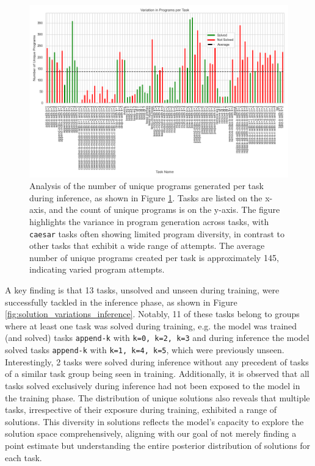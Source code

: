 \begin{figure}[H]
    \centering
    \includegraphics[width=\textwidth]{../img/plot_program_variations_binary_inference.png}
    \caption{Analysis of the number of unique programs generated per task during inference, as shown in Figure \ref{fig:program_variations_binary_inference}. Tasks are listed on the x-axis, and the count of unique programs is on the y-axis. The figure highlights the variance in program generation across tasks, with \texttt{caesar} tasks often showing limited program diversity, in contrast to other tasks that exhibit a wide range of attempts. The average number of unique programs created per task is approximately 145, indicating varied program attempts.}
    \label{fig:program_variations_binary_inference}
\end{figure}


A key finding is that 13 tasks, unsolved and unseen during training, were successfully tackled in the inference phase, as shown in Figure \ref{fig:solution_variations_inference}. Notably, 11 of these tasks belong to groups where at least one task was solved during training, e.g. the model was trained (and solved) tasks \texttt{append-k} with \texttt{k=0, k=2, k=3} and during inference the model solved tasks \texttt{append-k} with \texttt{k=1, k=4, k=5}, which were previously unseen. Interestingly, 2 tasks were solved during inference without any precedent of tasks of a similar task group being seen in training. Additionally, it is observed that all tasks solved exclusively during inference had not been exposed to the model in the training phase.
The distribution of unique solutions also reveals that multiple tasks, irrespective of their exposure during training, exhibited a range of solutions. This diversity in solutions reflects the model's capacity to explore the solution space comprehensively, aligning with our goal of not merely finding a point estimate but understanding the entire posterior distribution of solutions for each task.

